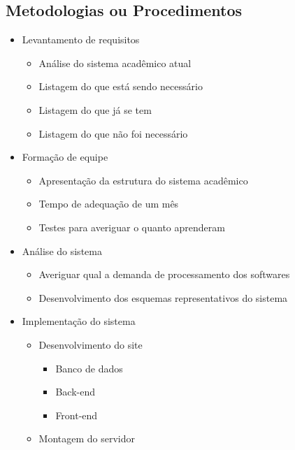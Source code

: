         \subsection{Metodologias ou Procedimentos}
            \begin{itemize}
                \item Levantamento de requisitos
                \begin{itemize}
                    \item Análise do sistema acadêmico atual
                    \item Listagem do que está sendo necessário
                    \item Listagem do que já se tem
                    \item Listagem do que não foi necessário
                \end{itemize}
                \item Formação de equipe
                \begin{itemize}
                    \item Apresentação da estrutura do sistema acadêmico
                    \item Tempo de adequação de um mês
                    \item Testes para averiguar o quanto aprenderam
                \end{itemize}
                \item Análise do sistema
                \begin{itemize}
                    \item Averiguar qual a demanda de processamento dos softwares
                    \item Desenvolvimento dos esquemas representativos do sistema
                \end{itemize}
                \item Implementação do sistema
                \begin{itemize}
                    \item Desenvolvimento do site
                    \begin{itemize}
                        \item Banco de dados
                        \item Back-end
                        \item Front-end
                    \end{itemize}
                    \item Montagem do servidor

\end{itemize}
\end{itemize}
